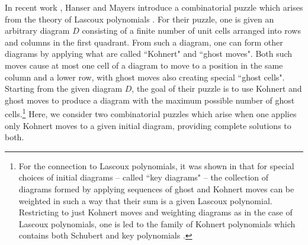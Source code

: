 \documentclass[letterpaper,10pt]{article}
\begin{document}

In recent work \cite{Puzzle1}, Hanser and Mayers introduce a combinatorial puzzle which arises from the theory of Lascoux polynomials \cite{Lascoux}. For their puzzle, one is given an arbitrary diagram $D$ consisting of a finite number of unit cells arranged into rows and columns in the first quadrant. From such a diagram, one can form other diagrams by applying what are called ``Kohnert" and ``ghost moves". Both such moves cause at most one cell of a diagram to move to a position in the same column and a lower row, with ghost moves also creating special ``ghost cells". Starting from the given diagram $D$, the goal of their puzzle is to use Kohnert and ghost moves to produce a diagram with the maximum possible number of ghost cells.\footnote{For the connection to Lascoux polynomials, it was shown in \cite{Pan1} that for special choices of initial diagrams -- called ``key diagrams" -- the collection of diagrams formed by applying sequences of ghost and Kohnert moves can be weighted in such a way that their sum is a given Lascoux polynomial. Restricting to just Kohnert moves and weighting diagrams as in the case of Lascoux polynomials, one is led to the family of Kohnert polynomials \cite{KP3,KP2,KP1} which contains both Schubert \cite{AssafSchu,LS82a} and key polynomials \cite{Dem74a,Dem74b,Kohnert}.} Here, we consider two combinatorial puzzles which arise when one applies only Kohnert moves to a given initial diagram, providing complete solutions to both.
\end{document}
